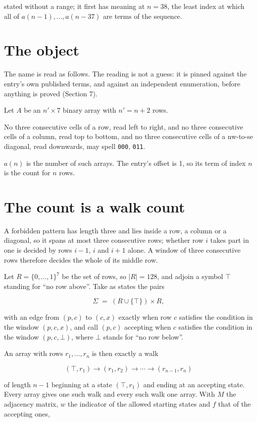 \documentclass[11pt]{article}
\theoremstyle{definition}
\begin{document}
stated without a range; it first has meaning at $n = 38$, the least index at which all of $a(n-1),\dots,a(n-37)$ are terms of the sequence.

\section{The object}

The name is read as follows. The reading is not a guess: it is pinned against the entry's own published terms, and against an independent enumeration, before anything is proved (Section 7).

Let $A$ be an $n' \times 7$ binary array with $n' = n + 2$ rows.

No three consecutive cells of a row, read left to right, and no three consecutive cells of a column, read top to bottom, and no three consecutive cells of a nw-to-se diagonal, read downwards, may spell \texttt{000}, \texttt{011}.

$a(n)$ is the number of such arrays. The entry's offset is 1, so its term of index $n$ is the count for $n$ rows.

\section{The count is a walk count}

A forbidden pattern has length three and lies inside a row, a column or a diagonal, so it spans at most three consecutive rows; whether row $i$ takes part in one is decided by rows $i-1$, $i$ and $i+1$ alone. A window of three consecutive rows therefore decides the whole of its middle row.

Let $R = \{0,\dots,1\}^{7}$ be the set of rows, so $|R| = 128$, and adjoin a symbol $\top$ standing for ``no row above''. Take as states the pairs

\[\Sigma \;=\; (R \cup \{\top\}) \times R,\]

with an edge from $(p,c)$ to $(c,x)$ exactly when row $c$ satisfies the condition in the window $(p,c,x)$, and call $(p,c)$ accepting when $c$ satisfies the condition in the window $(p,c,\bot)$, where $\bot$ stands for ``no row below''.

An array with rows $r_1,\dots,r_n$ is then exactly a walk

\[(\top,r_1) \to (r_1,r_2) \to \cdots \to (r_{n-1},r_n)\]

of length $n-1$ beginning at a state $(\top,r_1)$ and ending at an accepting state. Every array gives one such walk and every such walk one array. With $M$ the adjacency matrix, $w$ the indicator of the allowed starting states and $f$ that of the accepting ones,
\end{document}
